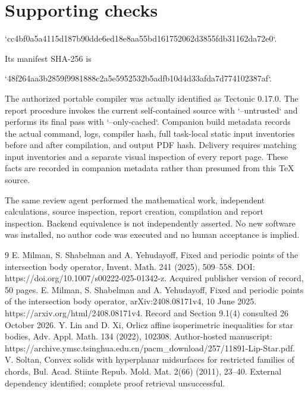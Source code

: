 \documentclass[10pt]{article}
\begin{document}
\section*{Supporting checks}
`cc4bf0a5a4115d187b90dde6ed18e8aa55bd161752062d3855fdb31162da72e0`.\par
Its manifest SHA-256 is\par
`48f264aa3b2859f9981888c2a5e5952532b5adfb10d4d33afda7d774102387af`.\par
The authorized portable compiler was actually identified as Tectonic 0.17.0. The report procedure invokes the current self-contained source with `--untrusted` and performs its final pass with `--only-cached`. Companion build metadata records the actual command, logs, compiler hash, full task-local static input inventories before and after compilation, and output PDF hash. Delivery requires matching input inventories and a separate visual inspection of every report page. These facts are recorded in companion metadata rather than presumed from this TeX source.\par
The same review agent performed the mathematical work, independent calculations, source inspection, report creation, compilation and report inspection. Backend equivalence is not independently asserted. No new software was installed, no author code was executed and no human acceptance is implied.\par
9 E. Milman, S. Shabelman and A. Yehudayoff, Fixed and periodic points of the intersection body operator, Invent. Math. 241 (2025), 509–558. DOI: https://doi.org/10.1007/s00222-025-01342-z. Acquired publisher version of record, 50 pages. E. Milman, S. Shabelman and A. Yehudayoff, Fixed and periodic points of the intersection body operator, arXiv:2408.08171v4, 10 June 2025. https://arxiv.org/html/2408.08171v4. Record and Section 9.1(4) consulted 26 October 2026. Y. Lin and D. Xi, Orlicz affine isoperimetric inequalities for star bodies, Adv. Appl. Math. 134 (2022), 102308. Author-hosted manuscript: https://archive.ymsc.tsinghua.edu.cn/pacm\_download/257/11891-Lip-Star.pdf. V. Soltan, Convex solids with hyperplanar midsurfaces for restricted families of chords, Bul. Acad. Stiinte Repub. Mold. Mat. 2(66) (2011), 23–40. External dependency identified; complete proof retrieval unsuccessful.\par
\end{document}
